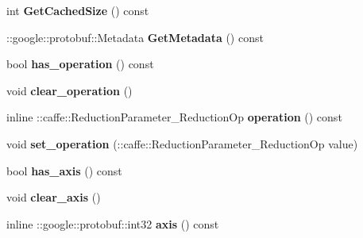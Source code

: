 \begin{DoxyCompactItemize}
\item 
\mbox{\label{classcaffe_1_1_reduction_parameter_adc8da857d192bb842d2b2ce0cb3149be}} 
int {\bfseries Get\+Cached\+Size} () const
\item 
\mbox{\label{classcaffe_1_1_reduction_parameter_a11a12d5cce214cebf36fa6201578daad}} 
\+::google\+::protobuf\+::\+Metadata {\bfseries Get\+Metadata} () const
\item 
\mbox{\label{classcaffe_1_1_reduction_parameter_a9c7b5ecf9e479cf912303071e76774e8}} 
bool {\bfseries has\+\_\+operation} () const
\item 
\mbox{\label{classcaffe_1_1_reduction_parameter_a5e7cef2077214f12c1e40ec3681ea713}} 
void {\bfseries clear\+\_\+operation} ()
\item 
\mbox{\label{classcaffe_1_1_reduction_parameter_ad0ba96ecbac41598a9dc4ef936f8a421}} 
inline \+::caffe\+::\+Reduction\+Parameter\+\_\+\+Reduction\+Op {\bfseries operation} () const
\item 
\mbox{\label{classcaffe_1_1_reduction_parameter_af7c40dc26527195e73bbbdf97541ed62}} 
void {\bfseries set\+\_\+operation} (\+::caffe\+::\+Reduction\+Parameter\+\_\+\+Reduction\+Op value)
\item 
\mbox{\label{classcaffe_1_1_reduction_parameter_a3df47ae0c62970ad1ce8f37e70dfb041}} 
bool {\bfseries has\+\_\+axis} () const
\item 
\mbox{\label{classcaffe_1_1_reduction_parameter_a408e37cbd3ea738d66003b97bd7bb6a3}} 
void {\bfseries clear\+\_\+axis} ()
\item 
\mbox{\label{classcaffe_1_1_reduction_parameter_addb1aa23be5da920892035731c002713}} 
inline \+::google\+::protobuf\+::int32 {\bfseries axis} () const
\item 
\mbox{\label{classcaffe_1_1_reduction_parameter_aecce48a929793980e26da492db7f2f62}} 

\end{DoxyCompactItemize}
